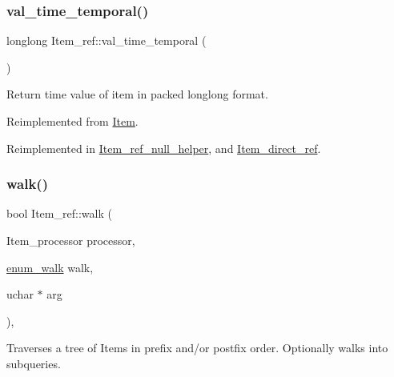\mbox{\label{classItem__ref_a962c929d6871099e06c7aa2868f09779}} 
\subsubsection{\texorpdfstring{val\+\_\+time\+\_\+temporal()}{val\_time\_temporal()}}
{\footnotesize\ttfamily longlong Item\+\_\+ref\+::val\+\_\+time\+\_\+temporal (\begin{DoxyParamCaption}{ }\end{DoxyParamCaption})\hspace{0.3cm}{\ttfamily [virtual]}}

Return time value of item in packed longlong format. 

Reimplemented from \mbox{\hyperlink{classItem_a69ef60a3917a1bb4832498a695754c58}{Item}}.



Reimplemented in \mbox{\hyperlink{classItem__ref__null__helper_a310f77154e5867053304bd27d75cbb53}{Item\+\_\+ref\+\_\+null\+\_\+helper}}, and \mbox{\hyperlink{classItem__direct__ref_af46d56da55778711183208f74fc592e9}{Item\+\_\+direct\+\_\+ref}}.

\mbox{\label{classItem__ref_a19c98abd79dbdb19a4af10a7c41f1449}} 
\subsubsection{\texorpdfstring{walk()}{walk()}}
{\footnotesize\ttfamily bool Item\+\_\+ref\+::walk (\begin{DoxyParamCaption}\item[{Item\+\_\+processor}]{processor,  }\item[{\mbox{\hyperlink{classItem_a4e68f315ba2a26543339e9f0efed3695}{enum\+\_\+walk}}}]{walk,  }\item[{uchar $\ast$}]{arg }\end{DoxyParamCaption})\hspace{0.3cm}{\ttfamily [inline]}, {\ttfamily [virtual]}}

Traverses a tree of Items in prefix and/or postfix order. Optionally walks into subqueries.


